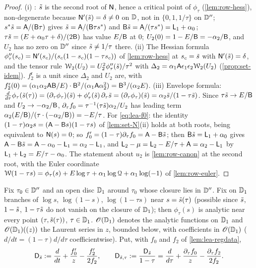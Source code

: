 \begin{proof}
(i) : $\tilde{s}$ is the second root of $\mathsf{N}$, hence a critical point of $\phi_\tau$ (\cref{lem:row-hess}), non-degenerate because $\mathsf{N}'(\tilde{s}) = \delta\neq 0$ on $\mathbb{D}$, not in $\{0,1,1/\tau\}$ on $\mathbb{D}''$; $s^{\ast}\tilde{s} = \mathsf{A}/(\mathsf{B}\tau)$ gives $\tilde{s} = \mathsf{A}/(\mathsf{B}\tau s^{\ast})$ and $\mathsf{B}\tilde{s} = \mathsf{A}/(\tau s^{\ast}) = \mathsf{L}_1+\alpha_0$; $\tau\tilde{s} = (E+\alpha_0\tau+\delta)/(2\mathsf{B})$ has value $E/\mathsf{B}$ at $0$; $U_2(0) = 1 - E/\mathsf{B} = -\alpha_2/\mathsf{B}$, and $U_2$ has no zero on $\mathbb{D}''$ since $\tilde{s}\neq 1/\tau$ there.
(ii) The Hessian formula $\phi_\tau''(s_c) = \mathsf{N}'(s_c)/(s_c(1-s_c)(1-\tau s_c))$ of \cref{lem:row-hess} at $s_c = \tilde{s}$ with $\mathsf{N}'(\tilde{s}) = \delta$, and the tensor rule $\mathcal{W}_2(U_2) = U_2^2\phi_\tau''(\tilde{s})/\tau^2$ with $\Delta_2 = \alpha_1\mathsf{A}\epsilon_1\epsilon_2\mathcal{W}_2(U_2)$ (\cref{prop:set-idem}). $f_2^{\mathrm{r}}$ is a unit since $\Delta_2$ and $U_2$ are, with $f_2^{\mathrm{r}}(0) = (\alpha_1\alpha_2\mathsf{A}\mathsf{B}/E)\cdot\mathsf{B}^2/(\alpha_1\mathsf{A}\alpha_2^2) = \mathsf{B}^3/(\alpha_2E)$.
(iii) Envelope formula: $\frac{d}{d\tau}\phi_\tau(\tilde{s}(\tau)) = (\partial_\tau\phi_\tau)(\tilde{s}) + \phi_\tau'(\tilde{s})\,\partial_\tau\tilde{s} = (\partial_\tau\phi_\tau)(\tilde{s}) = \alpha_2\tilde{s}/(1-\tau\tilde{s})$. Since $\tau\tilde{s}\to E/\mathsf{B}$ and $U_2\to-\alpha_2/\mathsf{B}$, $\partial_\tau f_0 = \tau^{-1}(\tau\tilde{s})\alpha_2/U_2$ has leading term $\alpha_2(E/\mathsf{B})/(\tau\cdot(-\alpha_2/\mathsf{B})) = -E/\tau$. For \eqref{eq:lea-f0}: the identity $(1-\tau)\alpha_2s = (\mathsf{A}-\mathsf{B} s)(1-\tau s)$ of \cref{lem:set-N}(ii) holds at both roots, being equivalent to $\mathsf{N}(s) = 0$; so $f_0' = (1-\tau)\partial_\tau f_0 = \mathsf{A}-\mathsf{B}\tilde{s}$; then $\mathsf{B}\tilde{s} = \mathsf{L}_1+\alpha_0$ gives $\mathsf{A}-\mathsf{B}\tilde{s} = \mathsf{A}-\alpha_0-\mathsf{L}_1 = \alpha_2-\mathsf{L}_1$, and $\mathsf{L}_2-\mu = \mathsf{L}_2 - E/\tau + \mathsf{A} = \alpha_2-\mathsf{L}_1$ by $\mathsf{L}_1+\mathsf{L}_2 = E/\tau-\alpha_0$. The statement about $u_2$ is \cref{lem:row-canon} at the second root, with the Euler coordinate $\mathcal{W}(1-\tau s) = \phi_\tau(s) + E\log\tau + \alpha_1\log\mathcal{Q} + \alpha_1\log(-1)$ of \cref{lem:row-euler}.
\end{proof}

Fix $\tau_0\in\mathbb{D}''$ and an open disc $\mathbb{D}_{1}$ around $\tau_0$ whose closure lies in $\mathbb{D}''$. Fix on $\mathbb{D}_{1}$ branches of $\log s$, $\log(1-s)$, $\log(1-\tau s)$ near $s = \tilde{s}(\tau)$ (possible since $\tilde{s}$, $1-\tilde{s}$, $1-\tau\tilde{s}$ do not vanish on the closure of $\mathbb{D}_{1}$); then $\phi_\tau(s)$ is analytic near every point $(\tau,\tilde{s}(\tau))$, $\tau\in\mathbb{D}_{1}$. $\mathscr{O}(\mathbb{D}_{1})$ denotes the analytic functions on $\mathbb{D}_{1}$ and $\mathscr{O}(\mathbb{D}_{1})((z))$ the Laurent series in $z$, bounded below, with coefficients in $\mathscr{O}(\mathbb{D}_{1})$ ($d/dt = (1-\tau)d/d\tau$ coefficientwise). Put, with $f_0$ and $f_2$ of \cref{lem:lea-regdata},
\[
\mathsf{D}_{\tilde{s}} := \frac{d}{dt} + \frac{f_0'}{z} - \frac{f_2'}{2f_2},\qquad \mathsf{D}_{\tilde{s},\tau} := \frac{\mathsf{D}_{\tilde{s}}}{1-\tau} = \frac{d}{d\tau} + \frac{\partial_\tau f_0}{z} - \frac{\partial_\tau f_2}{2f_2}.
\]

